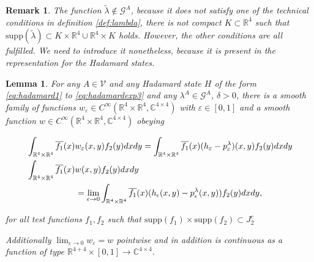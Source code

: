 \documentclass[b5paper,draft,openbib,12pt]{memoir}
\newtheorem{Lemma}[Def]{Lemma}
\newtheorem{Remark}[Def]{Remark}
\begin{document}
\begin{Remark}
The function \(\tilde{\lambda}\not\in \mathcal{G}^A\), because it does not satisfy one of the technical conditions in definition
\ref{def:lambda}, there is not compact \(K\subset\mathbb{R}^4\) such that 
\(\mathrm{supp}(\tilde{\lambda})\subset K\times \mathbb{R}^4 \cup \mathbb{R}^4\times K\) holds. However, the other conditions are all fulfilled. 
We need to introduce it nonetheless, because it is present in the representation for the Hadamard states.
\end{Remark}


\begin{Lemma}\label{lem:pointwise}
For any \(A\in \mathcal{V}\) and any Hadamard state \(H\) 
of the form \eqref{eq:hadamard1} to \eqref{eq:hadamardexp3}
and any \(\lambda^A \in \mathcal{G}^A\), \(\delta>0\),  
there is a smooth family of
functions \(w_\varepsilon\in C^\infty(\mathbb{R}^4\times \mathbb{R}^4,\mathbb{C}^{4\times4})\) with \(\varepsilon \in [0,1]\) and a smooth function 
  \(w\in C^\infty(\mathbb{R}^4\times \mathbb{R}^4,\mathbb{C}^{4\times 4})\)  obeying
  
\begin{align}
&\int_{\mathbb{R}^4\times\mathbb{R}^4} \overline{f_1}(x) w_\varepsilon(x,y) f_2(y)dxdy =
\int_{\mathbb{R}^4\times\mathbb{R}^4} \overline{f_1}(x) (h_\varepsilon - p_\varepsilon^\lambda)(x,y) f_2(y)dxdy\\
&\int_{\mathbb{R}^4\times\mathbb{R}^4} \overline{f_1}(x) w(x,y)f_2(y)dxdy \notag\\
&\hspace{2cm}=\lim_{\epsilon\rightarrow 0}\int_{\mathbb{R}^4\times\mathbb{R}^4} \overline{f_1}(x)(h_\epsilon (x,y)-p^\lambda_\epsilon(x,y)) f_2(y)dxdy,
\end{align}

for all test functions \(f_1,f_2\) such that \(\mathrm{supp}(f_1)\times\mathrm{supp}(f_2)\subset J_2^c\)
  
Additionally \(\lim_{\varepsilon \rightarrow 0}w_\varepsilon=w\) pointwise and in addition 
is continuous as a function of type \(\mathbb{R}^{4+4} \times[0,1]\rightarrow \mathbb{C}^{4\times 4}\).
\end{Lemma}
\end{document}
